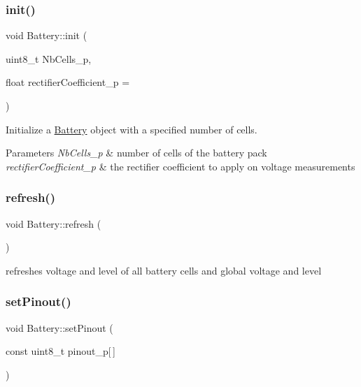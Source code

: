 \subsubsection{\texorpdfstring{init()}{init()}}
{\footnotesize\ttfamily void Battery\+::init (\begin{DoxyParamCaption}\item[{uint8\+\_\+t}]{Nb\+Cells\+\_\+p,  }\item[{float}]{rectifier\+Coefficient\+\_\+p = {} }\end{DoxyParamCaption})}



Initialize a \hyperlink{class_battery}{Battery} object with a specified number of cells. 


\begin{DoxyParams}{Parameters}
{\em Nb\+Cells\+\_\+p} & number of cells of the battery pack \\
\hline
{\em rectifier\+Coefficient\+\_\+p} & the rectifier coefficient to apply on voltage measurements \\
\hline
\end{DoxyParams}
\mbox{\label{class_battery_a7289442b8119494f06080d843c261c74}} 
\subsubsection{\texorpdfstring{refresh()}{refresh()}}
{\footnotesize\ttfamily void Battery\+::refresh (\begin{DoxyParamCaption}{ }\end{DoxyParamCaption})}



refreshes voltage and level of all battery cells and global voltage and level 

\mbox{\label{class_battery_a580d9582fbcf2c5f8185e3007852f73d}} 
\subsubsection{\texorpdfstring{set\+Pinout()}{setPinout()}}
{\footnotesize\ttfamily void Battery\+::set\+Pinout (\begin{DoxyParamCaption}\item[{const uint8\+\_\+t}]{pinout\+\_\+p\mbox{[}$\,$\mbox{]} }\end{DoxyParamCaption})}



